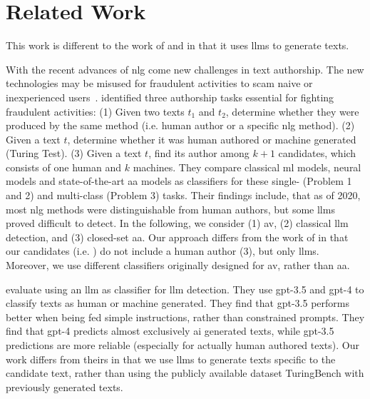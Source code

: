 \chapter{Related Work}
\label{chap:related_work}

This work is different to the work of \citet{koppel_determining_2014} and \citet{kocher_unine_2015} 
in that it uses \acp{llm} to generate \imp{} texts.


With the recent advances of \ac{nlg} come new challenges in text authorship.
The new technologies may be misused for fraudulent activities to scam naive or inexperienced users~\citep{uchendu_authorship_2020,bhattacharjee_fighting_2024}.
\citet{uchendu_authorship_2020} identified three authorship tasks essential for fighting fraudulent activities:
(1) Given two texts $t_1$ and $t_2$, determine whether they were produced by the same method (i.e. human author or a specific \ac{nlg} method).
(2) Given a text $t$, determine whether it was human authored or machine generated (Turing Test).
(3) Given a text $t$, find its author among $k+1$ candidates, which consists of one human and $k$ machines.
They compare classical \ac{ml} models, neural models and state-of-the-art \ac{aa} models as classifiers 
for these single- (Problem 1 and 2) and multi-class (Problem 3) tasks.
Their findings include, that as of 2020, most \ac{nlg} methods were distinguishable from human authors, 
but some \acp{llm} proved difficult to detect.
In the following, we consider (1) \ac{av}, (2) classical \ac{llm} detection, and (3) closed-set \ac{aa}.
Our approach differs from the work of \citet{uchendu_authorship_2020} in that our candidates (i.e. \imps{}) do not include a human author (3), 
but only \acp{llm}.
Moreover, we use different classifiers originally designed for \ac{av}, rather than \ac{aa}.

\citet{bhattacharjee_fighting_2024} evaluate using an \ac{llm} as classifier for \ac{llm} detection.
They use \ac{gpt}-3.5 and \ac{gpt}-4 to classify texts as human or machine generated.
They find that \ac{gpt}-3.5 performs better when being fed simple instructions, rather than constrained prompts.
They find that \ac{gpt}-4 predicts almost exclusively \ac{ai} generated texts, 
while \ac{gpt}-3.5 predictions are more reliable (especially for actually human authored texts).
Our work differs from theirs in that we use \acp{llm} to generate \imp{} texts specific to the candidate text, 
rather than using the publicly available dataset TuringBench with previously generated texts.

